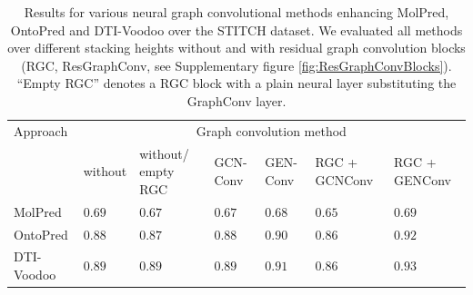 \documentclass[]{article}
\newcommand{\name}{DTI-Voodoo}
\begin{document}
\clearpage
\begin{table}[ht]
	\centering

	\begin{tabular}{|p{2.0cm}|p{1.1cm}|p{1.2cm}|p{0.8cm}|p{0.8cm}|p{1.2cm}|p{1.2cm}|}
		\hline
		Approach&\multicolumn{6}{c|}{Graph convolution method}\\
		&without&without/ empty RGC&GCN-Conv&GEN-Conv&RGC + GCNConv&RGC + GENConv\\
		\hline
		MolPred & $0.69$ & $0.67$& $0.67$& $0.68$& $0.65$& $0.69$\\
		\hline
		OntoPred &$0.88$ &$0.87$ &$0.88$&$0.90$&$0.86$&$0.92$\\
		\hline
		\name& $0.89$&$0.89$& $0.89$& $0.91$& $0.86$& $\mathbf{0.93}$\\
		\hline
	\end{tabular}
	\caption{\label{tab:Results}Results for various neural graph
          convolutional methods enhancing MolPred, OntoPred and
          \name{} over the STITCH dataset. We evaluated all methods
          over different stacking heights without and with residual
          graph convolution blocks (RGC, ResGraphConv, see
          Supplementary figure \ref{fig:ResGraphConvBlocks}). ``Empty
          RGC'' denotes a RGC block with a plain neural layer
          substituting the GraphConv layer.}
\end{table}
\end{document}
